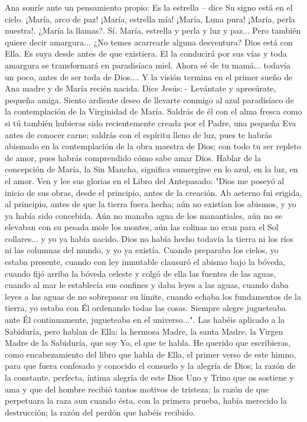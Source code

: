 \documentclass[12pt]{book} %
\begin{document}
Ana sonríe ante un pensamiento propio:  
Es la estrella – dice Su signo está en el cielo. ¡María, arco de paz! ¡María, estrella mía! ¡María, Luna pura! ¡María, perla 
nuestra!. 
¿María la llamas?. 
Sí. María, estrella y perla y luz y paz... 
Pero también quiere decir amargura... ¿No temes acarrearle alguna desventura? 
Dios está con Ella. Es suya desde antes de que existiera. El la conducirá por sus vías y toda amargura se transformará 
en paradisíaca miel. Ahora sé de tu mamá... todavía un poco, antes de ser toda de Dios.... 
Y la visión termina en el primer sueño de Ana madre y de María recién nacida. 
Dice Jesús: 
- Levántate y apresúrate, pequeña amiga. Siento ardiente deseo de llevarte conmigo al azul paradisíaco de la contemplación de la Virginidad de María. Saldrás de él con el alma fresca como si tú también hubieras sido recientemente creada por el Padre, una pequeña Eva antes de conocer carne; saldrás con el espíritu lleno de luz, pues te habrás abismado en la contemplación de la obra maestra de Dios; con todo tu ser repleto de amor, pues habrás comprendido cómo sabe amar Dios. Hablar de la concepción de María, la Sin Mancha, significa sumergirse en lo azul, en la luz, en el amor. 
Ven y lee sus glorias en el Libro del Antepasado: "Dios me poseyó al inicio de sus obras, desde el principio, antes de la 
creación. Ab aeterno fui erigida, al principio, antes de que la tierra fuera hecha; aún no existían los abismos, y yo ya había sido concebida. Aún no manaba agua de los manantiales, aún no se elevaban con su pesada mole los montes, aún las colinas no eran para el Sol collares... y yo ya había nacido. Dios no había hecho todavía la tierra ni los ríos ni las columnas del mundo, y yo ya existía. Cuando preparaba los cielos, yo estaba presente, cuando con ley inmutable clausuró el abismo bajo la bóveda, cuando fijó arriba la bóveda celeste y colgó de ella las fuentes de las aguas, cuando al mar le establecía sus confines y daba leyes a las aguas, cuando daba leyes a las aguas de no sobrepasar su límite, cuando echaba los fundamentos de la tierra, yo estaba con Él ordenando todas las cosas. Siempre alegre jugueteaba ante Él continuamente, jugueteaba en el universo...". Las habéis aplicado a la Sabiduría, pero hablan de Ella: la hermosa Madre, la santa Madre, la Virgen Madre de la Sabiduría, que soy Yo, el que te habla. 
He querido que escribieras, como encabezamiento del libro que habla de Ella, el primer verso de este himno, para que 
fuera confesado y conocido el consuelo y la alegría de Dios; la razón de la constante, perfecta, íntima alegría de este Dios Uno y Trino que os sostiene y ama y que del hombre recibió tantos motivos de tristeza; la razón de que perpetuara la raza aun cuando ésta, con la primera prueba, había merecido la destrucción; la razón del perdón que habéis recibido. 
\end{document}
